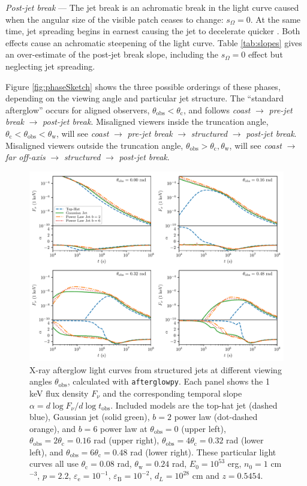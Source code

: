 \documentclass[twocolumn]{aastex62}
\newcommand{\afterglowpy}{{\tt afterglowpy}}
\newcommand{\tobs}{\ensuremath{t_{\mathrm{obs}}}}
\newcommand{\thobs}{\ensuremath{\theta_{\mathrm{obs}}}}
\newcommand{\thW}{\ensuremath{\theta_{\mathrm{w}}}}
\newcommand{\thC}{\ensuremath{\theta_{\mathrm{c}}}}
\newcommand{\epse}{\ensuremath{\varepsilon_{\mathrm{e}}}}
\newcommand{\epsB}{\ensuremath{\varepsilon_{\mathrm{B}}}}
\newcommand{\som}{\ensuremath{s_{\Omega}}}
\begin{document}
\emph{Post-jet break} --- The jet break is an achromatic break in the light curve caused when the angular size of the visible patch ceases to change: $\som = 0$.  At the same time, jet spreading begins in earnest causing the jet to decelerate quicker \citep{Rhoads:1999aa}.  Both effects cause an achromatic steepening of the light curve.  Table \ref{tab:slopes} gives an over-estimate of the post-jet break slope, including the $\som=0$ effect but neglecting jet spreading.


Figure \ref{fig:phaseSketch} shows the three possible orderings of these phases, depending on the viewing angle and particular jet structure.  The ``standard afterglow'' occurs for aligned observers, $\thobs < \thC$, and follows \emph{coast} $\to$ \emph{pre-jet break} $\to$ \emph{post-jet break}.  Misaligned viewers inside the truncation angle, $\thC < \thobs < \thW$, will see \emph{coast} $\to$ \emph{pre-jet break} $\to$ \emph{structured} $\to$ \emph{post-jet break}.  Misaligned viewers outside the truncation angle, $\thobs > \thC, \thW$, will see \emph{coast} $\to$ \emph{far off-axis} $\to$ \emph{structured} $\to$ \emph{post-jet break}.

\begin{figure}
	\includegraphics[width=\textwidth]{figs/lc_thV_model_multi.pdf}
	\caption{X-ray afterglow light curves from structured jets at different viewing angles $\thobs$, calculated with \afterglowpy{}.  Each panel shows the 1 keV flux density $F_\nu$ and the corresponding temporal slope $\alpha = d\log F_\nu / d\log \tobs$.  Included models are the top-hat jet (dashed blue), Gaussian jet (solid green), $b=2$ power law (dot-dashed orange), and $b=6$ power law at $\thobs=0$ (upper left), $\thobs=2\thC=0.16$ rad (upper right), $\thobs=4\thC=0.32$ rad (lower left), and $\thobs=6\thC=0.48$ rad (lower right). These particular light curves all use $\thC = 0.08$ rad, $\thW = 0.24$ rad, $E_0 = 10^{53}$ erg, $n_0=1$ cm$^{-3}$, $p=2.2$, $\epse = 10^{-1}$, $\epsB = 10^{-2}$, $d_L=10^{28}$ cm and $z=0.5454$. \label{fig:thVmodel}}
\end{figure}
\end{document}

